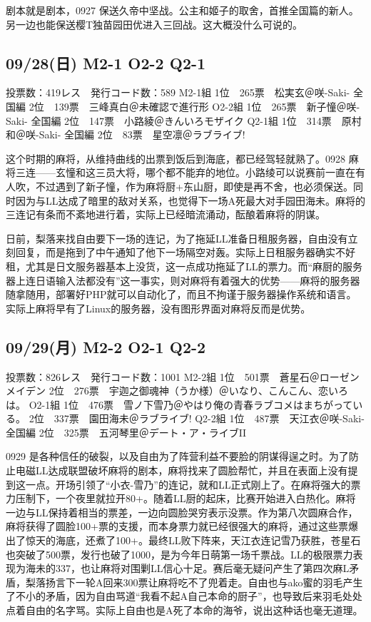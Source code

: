 剧本就是剧本，0927 保送久帝中坚战。公主和姬子的取舍，首推全国篇的新人。另一边也能保送樱T独苗园田优进入三回战。这大概没什么可说的。

\subsection{09/28(日) M2-1 O2-2 Q2-1}

	投票数：419レス　発行コード数：589
	M2-1組
	1位　265票　松実玄＠咲-Saki- 全国編
	2位　139票　三峰真白＠未確認で進行形
	O2-2組
	1位　265票　新子憧＠咲-Saki- 全国編
	2位　147票　小路綾＠きんいろモザイク
	Q2-1組
	1位　314票　原村和＠咲-Saki- 全国編
	2位　83票　星空凛＠ラブライブ!

这个时期的麻将，从维持曲线的出票到饭后到海底，都已经驾轻就熟了。0928 麻将三连——玄憧和这三员大将，哪个都不能弃的地位。小路绫可以说赛前一直在有人吹，不过遇到了新子憧，作为麻将厨+东山厨，即使是再不舍，也必须保送。同时因为与LL达成了暗里的敌对关系，也觉得下一场A死最大对手园田海未。麻将的三连记有条而不紊地进行着，实际上已经暗流涌动，酝酿着麻将的阴谋。

日前，梨落来找自由要下一场的连记，为了拖延LL准备日租服务器，自由没有立刻回复，而是拖到了中午通知了他下一场隔空对轰。实际上日租服务器确实不好租，尤其是日文服务器基本上没货，这一点成功拖延了LL的票力。而“麻厨的服务器上连日语输入法都没有”这一事实，则对麻将有着强大的优势——麻将的服务器随拿随用，部署好PHP就可以自动化了，而且不拘谨于服务器操作系统和语言。实际上麻将早有了Linux的服务器，没有图形界面对麻将反而是优势。

\subsection{09/29(月) M2-2 O2-1 Q2-2}

	投票数：826レス　発行コード数：1001
	M2-2組
	1位　501票　蒼星石＠ローゼンメイデン
	2位　276票　宇迦之御魂神（うか様）＠いなり、こんこん、恋いろは。
	O2-1組
	1位　476票　雪ノ下雪乃＠やはり俺の青春ラブコメはまちがっている。
	2位　337票　園田海未＠ラブライブ!
	Q2-2組
	1位　487票　天江衣＠咲-Saki- 全国編
	2位　325票　五河琴里＠デート・ア・ライブII

0929 是各种信任的破裂，以及自由为了阵营利益不要脸的阴谋得逞之时。为了防止电磁LL达成联盟破坏麻将的剧本，麻将找来了圆脸帮忙，并且在表面上没有提到这一点。开场引领了“小衣-雪乃”的连记，就和LL正式刚上了。在麻将强大的票力压制下，一个夜里就拉开80+。随着LL厨的起床，比赛开始进入白热化。麻将一边与LL保持着相当的票差，一边向圆脸哭穷表示没票。作为第八次圆麻合作，麻将获得了圆脸100+票的支援，而本身票力就已经很强大的麻将，通过这些票爆出了惊天的海底，还煮了100+。最终LL败下阵来，天江衣连记雪乃获胜，苍星石也突破了500票，发行也破了1000，是为今年日萌第一场千票战。LL的极限票力表现为海未的337，也让麻将对围剿LL信心十足。赛后毫无疑问产生了第四次麻L矛盾，梨落扬言下一轮A回来300票让麻将吃不了兜着走。自由也与ako蜜的羽毛产生了不小的矛盾，因为自由骂道“我看不起A自己本命的厨子”，也导致后来羽毛处处点着自由的名字骂。实际上自由也是A死了本命的海爷，说出这种话也毫无道理。

